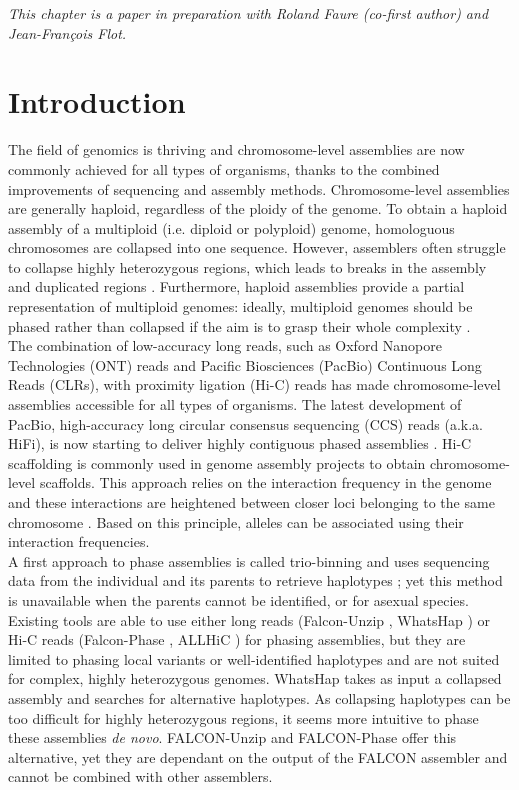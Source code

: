 %

\textit{This chapter is a paper in preparation with Roland Faure (co-first author) and Jean-François Flot.}

\section{Introduction}

The field of genomics is thriving and chromosome-level assemblies are now commonly achieved for all types of organisms, thanks to the combined improvements of sequencing and assembly methods. Chromosome-level assemblies are generally haploid, regardless of the ploidy of the genome. To obtain a haploid assembly of a multiploid (i.e. diploid or polyploid) genome, homologuous chromosomes are collapsed into one sequence. However, assemblers often struggle to collapse highly heterozygous regions, which leads to breaks in the assembly and duplicated regions \cite{guiglielmoni2020}. Furthermore, haploid assemblies provide a partial representation of multiploid genomes: ideally, multiploid genomes should be phased rather than collapsed if the aim is to grasp their whole complexity \cite{unzipping}.\\

The combination of low-accuracy long reads, such as Oxford Nanopore Technologies (ONT) reads and Pacific Biosciences (PacBio) Continuous Long Reads (CLRs), with proximity ligation (Hi-C) reads has made chromosome-level assemblies accessible for all types of organisms. The latest development of PacBio, high-accuracy long circular consensus sequencing (CCS) reads (a.k.a. HiFi), is now starting to deliver highly contiguous phased assemblies \cite{flye,hifiasm,hicanu}. Hi-C scaffolding is commonly used in genome assembly projects to obtain chromosome-level scaffolds. This approach relies on the interaction frequency in the genome and these interactions are heightened between closer loci belonging to the same chromosome \cite{flot2015contact}. Based on this principle, alleles can be associated using their interaction frequencies. \\

A first approach to phase assemblies is called trio-binning and uses sequencing data from the individual and its parents to retrieve haplotypes \cite{triocanu}; yet this method is unavailable when the parents cannot be identified, or for asexual species. Existing tools are able to use either long reads (Falcon-Unzip \cite{falcon-unzip}, WhatsHap \cite{whatshap}) or Hi-C reads (Falcon-Phase \cite{falcon-phase}, ALLHiC \cite{allhic}) for phasing assemblies, but they are limited to phasing local variants or well-identified haplotypes and are not suited for complex, highly heterozygous genomes. WhatsHap takes as input a collapsed assembly and searches for alternative haplotypes. As collapsing haplotypes can be too difficult for highly heterozygous regions, it seems more intuitive to phase these assemblies \textit{de novo}. FALCON-Unzip and FALCON-Phase offer this alternative, yet they are dependant on the output of the FALCON assembler and cannot be combined with other assemblers. \\

